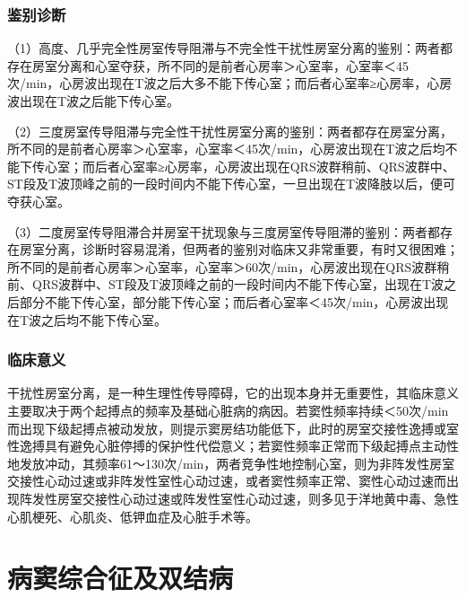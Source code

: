 \protect\hypertarget{text00033.htmlux5cux23subid407}{}{}

\subsection{鉴别诊断}

（1）高度、几乎完全性房室传导阻滞与不完全性干扰性房室分离的鉴别：两者都存在房室分离和心室夺获，所不同的是前者心房率＞心室率，心室率＜45次/min，心房波出现在T波之后大多不能下传心室；而后者心室率≥心房率，心房波出现在T波之后能下传心室。

（2）三度房室传导阻滞与完全性干扰性房室分离的鉴别：两者都存在房室分离，所不同的是前者心房率＞心室率，心室率＜45次/min，心房波出现在T波之后均不能下传心室；而后者心室率≥心房率，心房波出现在QRS波群稍前、QRS波群中、ST段及T波顶峰之前的一段时间内不能下传心室，一旦出现在T波降肢以后，便可夺获心室。

（3）二度房室传导阻滞合并房室干扰现象与三度房室传导阻滞的鉴别：两者都存在房室分离，诊断时容易混淆，但两者的鉴别对临床又非常重要，有时又很困难；所不同的是前者心房率＞心室率，心室率＞60次/min，心房波出现在QRS波群稍前、QRS波群中、ST段及T波顶峰之前的一段时间内不能下传心室，出现在T波之后部分不能下传心室，部分能下传心室；而后者心室率＜45次/min，心房波出现在T波之后均不能下传心室。

\protect\hypertarget{text00033.htmlux5cux23subid408}{}{}

\subsection{临床意义}

干扰性房室分离，是一种生理性传导障碍，它的出现本身并无重要性，其临床意义主要取决于两个起搏点的频率及基础心脏病的病因。若窦性频率持续＜50次/min而出现下级起搏点被动发放，则提示窦房结功能低下，此时的房室交接性逸搏或室性逸搏具有避免心脏停搏的保护性代偿意义；若窦性频率正常而下级起搏点主动性地发放冲动，其频率61～130次/min，两者竞争性地控制心室，则为非阵发性房室交接性心动过速或非阵发性室性心动过速，或者窦性频率正常、窦性心动过速而出现阵发性房室交接性心动过速或阵发性室性心动过速，则多见于洋地黄中毒、急性心肌梗死、心肌炎、低钾血症及心脏手术等。

\protect\hypertarget{text00034.html}{}{}

\protect\hypertarget{text00034.htmlux5cux23chapter34}{}{}

\chapter{病窦综合征及双结病}

